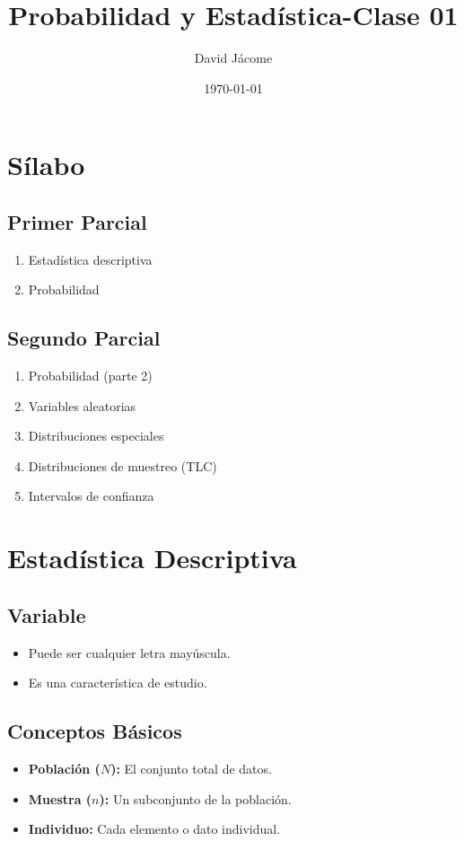 \documentclass[11pt]{article}
\author{David Jácome}
\date{\today}
\title{Probabilidad y Estadística-Clase 01}
\begin{document}
\maketitle
\tableofcontents


\section{Sílabo}
\label{sec:orge993f0e}
\subsection{Primer Parcial}
\label{sec:orga9bfa66}
\begin{enumerate}
\item Estadística descriptiva
\item Probabilidad
\end{enumerate}
\subsection{Segundo Parcial}
\label{sec:orgc8588ab}
\begin{enumerate}
\item Probabilidad (parte 2)
\item Variables aleatorias
\item Distribuciones especiales
\item Distribuciones de muestreo (TLC)
\item Intervalos de confianza
\end{enumerate}

\section{Estadística Descriptiva}
\label{sec:orgc09a1a2}
\subsection{Variable}
\label{sec:org561a64b}
\begin{itemize}
\item Puede ser cualquier letra mayúscula.
\item Es una característica de estudio.
\end{itemize}

\subsection{Conceptos Básicos}
\label{sec:orgd4cfbe8}
\begin{itemize}
\item \textbf{Población (\(N\)):} El conjunto total de datos.
\item \textbf{Muestra (\(n\)):} Un subconjunto de la población.
\item \textbf{Individuo:} Cada elemento o dato individual.
\end{itemize}
\end{document}
